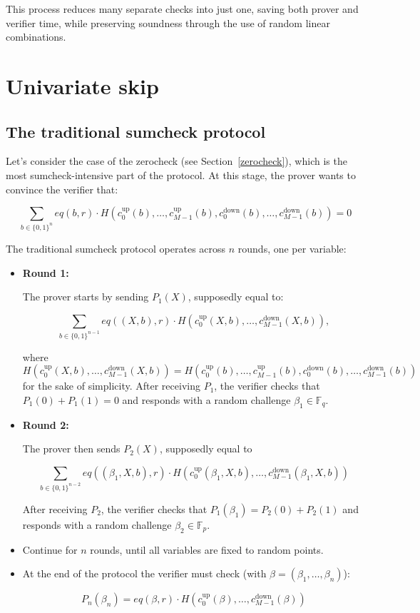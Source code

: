 \documentclass{article}
\newcommand{\Fp}{\mathbb F_p}
\newcommand{\Fq}{\mathbb F_q}
\begin{document}
This process reduces many separate checks into just one, saving both prover and verifier time, while preserving soundness through the use of random linear combinations.



\section{Univariate skip}

\subsection{The traditional sumcheck protocol}

Let's consider the case of the zerocheck (see Section~\ref{zerocheck}), which is the most sumcheck-intensive part of the protocol. At this stage, the prover wants to convince the verifier that:

$$ \sum_{b \in \{0, 1\}^n} eq(b, r) \cdot H(c_0^{\text{up}}(b), \dots, c_{M-1}^{\text{up}}(b), c_0^{\text{down}}(b), \dots, c_{M-1}^{\text{down}}(b)) = 0$$

The traditional sumcheck protocol operates across $n$ rounds, one per variable:

\begin{itemize}
    \item \textbf{Round 1:}
    
    The prover starts by sending $P_1(X)$, supposedly equal to:

    $$ \sum_{b \in \{0, 1\}^{n-1}} eq((X, b), r) \cdot H(c_0^{\text{up}}(X, b), \dots, c_{M-1}^{\text{down}}(X, b)), $$

    where $ H(c_0^{\text{up}}(X, b), \dots, c_{M-1}^{\text{down}}(X, b)) = H(c_0^{\text{up}}(b), \dots, c_{M-1}^{\text{up}}(b), c_0^{\text{down}}(b), \dots, c_{M-1}^{\text{down}}(b))$ for the sake of simplicity. After receiving $P_1$, the verifier checks that $P_1(0) + P_1(1) = 0$ and responds with a random challenge $\beta_1 \in \Fq$.
    \item \textbf{Round 2:}
    
    The prover then sends $P_2(X)$, supposedly equal to

        $$ \sum_{b \in \{0, 1\}^{n-2}} eq((\beta_1, X, b), r) \cdot H(c_0^{\text{up}}(\beta_1, X, b), \dots, c_{M-1}^{\text{down}}(\beta_1, X, b)) $$
    
    After receiving $P_2$, the verifier checks that $P_1(\beta_1) = P_2(0) + P_2(1)$ and responds with a random challenge $\beta_2 \in \Fp$.
    \item Continue for $n$ rounds, until all variables are fixed to random points.
    \item At the end of the protocol the verifier must check (with $\beta = (\beta_1, \dots, \beta_n)$):
    
    $$P_n(\beta_n) = eq(\beta, r) \cdot H(c_0^{\text{up}}(\beta), \dots, c_{M-1}^{\text{down}}(\beta))$$

\end{itemize}
\end{document}
